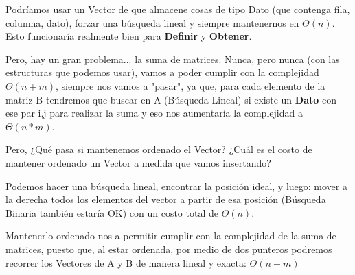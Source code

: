 \documentclass[10pt,a4paper]{article}
\begin{document}
\par Podríamos usar un Vector de que almacene cosas de tipo Dato (que contenga fila, columna, dato), forzar una búsqueda lineal y siempre mantenernos
en \ensuremath{\Theta(n)}. Esto funcionaría realmente bien para \textbf{Definir} y \textbf{Obtener}.
\par Pero, hay un gran problema... la suma de matrices. Nunca, pero nunca (con las estructuras que podemos usar), vamos a poder cumplir con la complejidad \ensuremath{\Theta(n + m)}, siempre nos vamos a "pasar", ya que, para cada elemento de la matriz B tendremos que buscar en A (Búsqueda Lineal) si existe un \textbf{Dato} con ese par i,j para realizar la suma y eso nos aumentaría la complejidad a \ensuremath{\Theta(n * m)}.
\par Pero, ¿Qué pasa si mantenemos ordenado el Vector? ¿Cuál es el costo de mantener ordenado un Vector a medida que vamos insertando?
\par Podemos hacer una búsqueda lineal, encontrar la posición ideal, y luego: mover a la derecha todos los elementos del vector a partir de esa posición (Búsqueda Binaria también estaría OK) con un costo total de \ensuremath{\Theta(n)}.
\par Mantenerlo ordenado nos a permitir cumplir con la complejidad de la suma de matrices, puesto que, al estar ordenada, por medio de dos punteros podremos recorrer los Vectores de A y B de manera lineal y exacta: \ensuremath{\Theta(n + m)}
\end{document}
